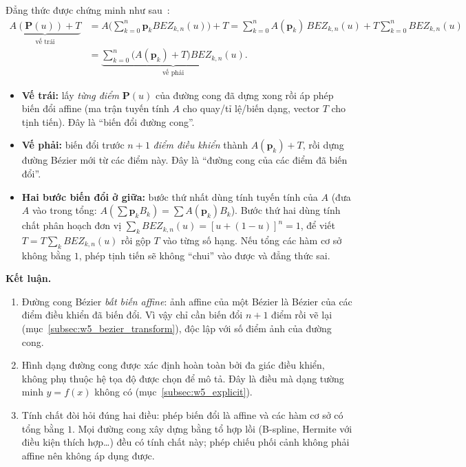 Đẳng thức được chứng minh như sau~\citep{dhmt_lec6}:
\begin{align}
\underbrace{A(\mathbf{P}(u)) + T}_{\text{vế trái}}
&= A\Big(\sum_{k=0}^{n} \mathbf{p}_k BEZ_{k,n}(u)\Big) + T
= \sum_{k=0}^{n} A(\mathbf{p}_k)\, BEZ_{k,n}(u) + T \sum_{k=0}^{n} BEZ_{k,n}(u) \nonumber\\
&= \underbrace{\sum_{k=0}^{n} \big(A(\mathbf{p}_k) + T\big) BEZ_{k,n}(u)}_{\text{vế phải}}.
\end{align}
\begin{itemize}
    \item \textbf{Vế trái:} lấy \emph{từng điểm} $\mathbf{P}(u)$ của đường cong đã dựng xong rồi áp phép biến đổi affine (ma trận tuyến tính $A$ cho quay/tỉ lệ/biến dạng, vector $T$ cho tịnh tiến). Đây là ``biến đổi đường cong''.
    \item \textbf{Vế phải:} biến đổi trước $n + 1$ \emph{điểm điều khiển} thành $A(\mathbf{p}_k) + T$, rồi dựng đường Bézier mới từ các điểm này. Đây là ``đường cong của các điểm đã biến đổi''.
    \item \textbf{Hai bước biến đổi ở giữa:} bước thứ nhất dùng tính tuyến tính của $A$ (đưa $A$ vào trong tổng: $A(\sum \mathbf{p}_k B_k) = \sum A(\mathbf{p}_k) B_k$). Bước thứ hai dùng tính chất phân hoạch đơn vị $\sum_{k} BEZ_{k,n}(u) = [u + (1 - u)]^n = 1$, để viết $T = T\sum_k BEZ_{k,n}(u)$ rồi gộp $T$ vào từng số hạng. Nếu tổng các hàm cơ sở không bằng $1$, phép tịnh tiến sẽ không ``chui'' vào được và đẳng thức sai.
\end{itemize}
\textbf{Kết luận.}
\begin{enumerate}
    \item Đường cong Bézier \emph{bất biến affine}: ảnh affine của một Bézier là Bézier của các điểm điều khiển đã biến đổi. Vì vậy chỉ cần biến đổi $n + 1$ điểm rồi vẽ lại (mục~\ref{subsec:w5_bezier_transform}), độc lập với số điểm ảnh của đường cong.
    \item Hình dạng đường cong được xác định hoàn toàn bởi đa giác điều khiển, không phụ thuộc hệ tọa độ được chọn để mô tả. Đây là điều mà dạng tường minh $y = f(x)$ không có (mục~\ref{subsec:w5_explicit}).
    \item Tính chất đòi hỏi đúng hai điều: phép biến đổi là affine và các hàm cơ sở có tổng bằng $1$. Mọi đường cong xây dựng bằng tổ hợp lồi (B-spline, Hermite với điều kiện thích hợp\ldots) đều có tính chất này; phép chiếu phối cảnh không phải affine nên không áp dụng được.
\end{enumerate}

